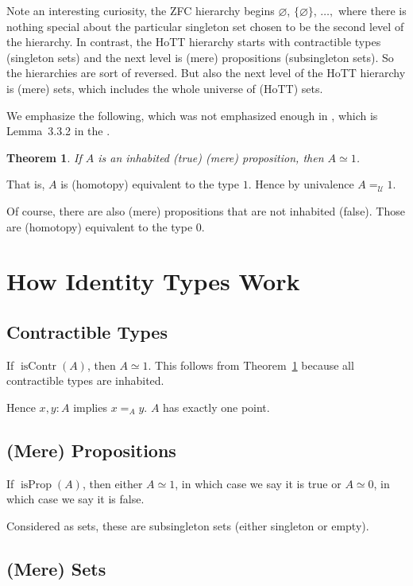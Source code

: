 \documentclass[11pt]{article}
\DeclareMathOperator{\iscontr}{isContr}
\DeclareMathOperator{\isprop}{isProp}
\newcommand{\universe}{\mathcal{U}}
\let\emptyset=\varnothing
\newtheorem{theorem}{Theorem}
\begin{document}
Note an interesting curiosity, the ZFC hierarchy begins $\emptyset$,
$\{\emptyset\}$, $\ldots,$ where there is nothing special about the particular
singleton set chosen to be the second level of the hierarchy.
In contrast, the HoTT hierarchy 
\citep[Section~8.11]{geyer-survey} starts with contractible types (singleton
sets) and the next level is (mere) propositions (subsingleton sets).
So the hierarchies are sort of reversed.  But also the next level of the
HoTT hierarchy is (mere) sets, which includes the whole universe of
(HoTT) sets.

We emphasize the following, which was not emphasized enough in
\citet{geyer-survey}, which is Lemma~{3.3.2} in the .
\begin{theorem} \label{th:prop}
If $A$ is an inhabited (true) (mere) proposition, then $A \simeq 1$.
\end{theorem}
That is, $A$ is (homotopy) equivalent to the type $1$.
Hence by univalence $A =_\universe 1$.

Of course, there are also (mere) propositions that are not inhabited (false).
Those are (homotopy) equivalent to the type $0$.

\section{How Identity Types Work}

\subsection{Contractible Types}

If $\iscontr(A)$, then $A \simeq 1$.  This follows from
Theorem~\ref{th:prop} because all contractible types are inhabited.

Hence $x, y : A$ implies $x =_A y$.  $A$ has exactly one point.

\subsection{(Mere) Propositions}

If $\isprop(A)$, then either $A \simeq 1$, in which case we say it is
true or $A \simeq 0$, in which case we say it is false.

Considered as sets, these are subsingleton sets (either singleton or empty).

\subsection{(Mere) Sets}
\end{document}
